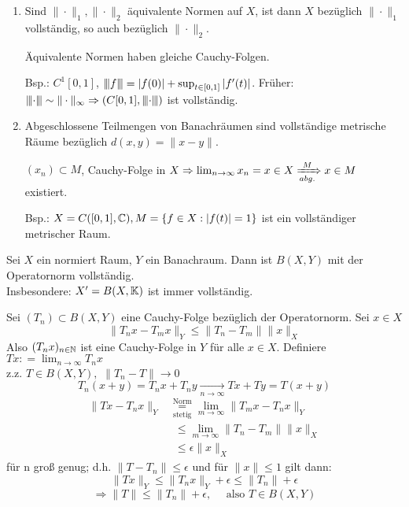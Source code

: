 \begin{bemerkung}
	\begin{enumerate}[label=\alph*\upshape)]
		\item Sind $\| \cdot \|_{1}, \| \cdot \|_{2}$ äquivalente Normen auf $X$, ist dann $X$ bezüglich $\| \cdot \|_{1}$ vollständig, so auch bezüglich $\| \cdot \|_{2}$.
			\begin{beweis}
				Äquivalente Normen haben gleiche Cauchy-Folgen.
			\end{beweis}
			Bsp.: $C^{1}[0, 1]$, ${\left\vert\kern-0.25ex\left\vert\kern-0.25ex\left\vert f\right\vert\kern-0.25ex\right\vert\kern-0.25ex\right\vert} = |f(0)| + \sup_{t \in [0, 1]} | f'(t) |$. Früher: ${\left\vert\kern-0.25ex\left\vert\kern-0.25ex\left\vert\cdot\right\vert\kern-0.25ex\right\vert\kern-0.25ex\right\vert} \sim \| \cdot \|_{\infty} \Rightarrow \left( C[0, 1], {\left\vert\kern-0.25ex\left\vert\kern-0.25ex\left\vert\cdot\right\vert\kern-0.25ex\right\vert\kern-0.25ex\right\vert} \right)$ ist vollständig.
		\item Abgeschlossene Teilmengen von 	Banachräumen sind vollständige metrische Räume bezüglich $d(x, y) = \| x - y\|$.
			\begin{beweis}
				$(x_{n}) \subset M$, Cauchy-Folge in $X \Rightarrow \lim_{n \rightarrow \infty} x_{n} = x \in X \xRightarrow[abg.]{M} x \in M$ existiert.	
			\end{beweis}
			Bsp.: $X = C([0, 1], \mathbb{C}), M = \{ f \in X: |f ( t )| = 1 \}$ ist ein vollständiger metrischer Raum.
	\end{enumerate}
\end{bemerkung}


\begin{satz} \label{satz:5.6}
	Sei $X$ ein normiert Raum, $Y$ ein Banachraum.
	Dann ist $B(X, Y)$ mit der Operatornorm vollständig. \\
	Insbesondere: $X' = B(X, \mathbb{K})$ ist immer  vollständig.
\end{satz}

\begin{beweis}
	Sei $(T_{n}) \subset B(X, Y)$ eine Cauchy-Folge bezüglich der Operatornorm. Sei $x \in X$
	\[ \| T_{n} x - T_{m} x \|_{Y} \leq \| T_{n} - T_{m} \| \|x\|_{X} \]
	Also $(T_{n}x)_{n \in \mathbb{N}}$ ist eine Cauchy-Folge in $Y$ für alle $x \in X$. Definiere $T x : = \lim_{n \rightarrow \infty} T_{n} x$ \\
	z.z. $T \in B(X, Y),$ $\| T_{n} - T \| \rightarrow 0$ \\
	\[ T_{n} (x + y)  = T_{n} x + T_{n} y \xrightarrow[n \rightarrow \infty]{} Tx + Ty = T(x + y) \]
	\begin{align*}
		\| Tx - T_{n}x \|_{Y} & \underset{\text{stetig}}{\overset{\text{Norm}}{=}} \lim_{m \rightarrow \infty} \| T_{m} x - T_{n} x \|_{Y} \\
		 & ~~ \leq \lim_{m \rightarrow \infty} \| T_{n} - T_{m} \| \| x \|_{X} \\
		 & ~~ \leq \epsilon \| x \|_{X}
	\end{align*}
	für n gro{\ss} genug; d.h. $\| T - T_{n} \| \leq \epsilon$ und für $\| x \| \leq 1$ gilt dann:
	\[ \| T x \|_{Y} \leq \| T_{n} x \|_{Y} + \epsilon \leq \| T_{n} \| + \epsilon  \]
	\[ \Rightarrow \| T \| \leq \| T_{n} \| + \epsilon, \quad \text{ also } T \in B(X, Y) \]
\end{beweis}

